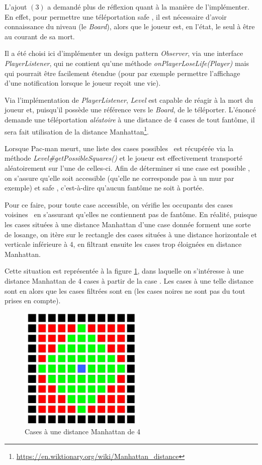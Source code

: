 \documentclass[12pt, openany]{report}
\begin{document}
L'ajout $(3)$ a demandé plus de réflexion quant à la manière de l'implémenter. En effet, pour permettre une téléportation \og safe \fg , il est nécessaire d'avoir connaissance du niveau (le \mbox{\textit{Board}}), alors que le joueur est, en l'état, le seul à être au courant de sa mort.

Il a été choisi ici d'implémenter un design pattern \mbox{\textit{Observer}}, via une interface \mbox{\textit{PlayerListener}}, qui ne contient qu'une méthode \mbox{\textit{onPlayerLoseLife(Player)}} mais qui pourrait être facilement étendue (pour par exemple permettre l'affichage d'une notification lorsque le joueur reçoit une vie).

Via l'implémentation de \mbox{\textit{PlayerListener}}, \mbox{\textit{Level}} est capable de réagir à la mort du joueur et, puisqu'il possède une référence vers le \mbox{\textit{Board}}, de le téléporter. L'énoncé demande une téléportation \textit{aléatoire} à une distance de 4 cases de tout fantôme, il sera fait utilisation de la distance Manhattan\footnote{\url{https://en.wiktionary.org/wiki/Manhattan_distance}}.

Lorsque Pac-man meurt, une liste des cases \og possibles \fg \, est récupérée via la méthode \mbox{\textit{Level\#getPossibleSquares()}} et le joueur est effectivement transporté aléatoirement sur l'une de celles-ci. Afin de déterminer si une case est \og possible \fg , on s'assure qu'elle soit accessible (qu'elle ne corresponde pas à un mur par exemple) et \og safe \fg , c'est-à-dire qu'aucun fantôme ne soit à portée.

Pour ce faire, pour toute case accessible, on vérifie les occupants des cases \og voisines \fg \, en s'assurant qu'elles ne contiennent pas de fantôme. En réalité, puisque les cases situées à une distance Manhattan d'une case donnée forment une sorte de losange, on itère sur le rectangle des cases situées à une distance horizontale et verticale inférieure à 4, en filtrant ensuite les cases trop éloignées en distance Manhattan. 

Cette situation est représentée à la figure \ref{manhattan}, dans laquelle on s'intéresse à une distance Manhattan de 4 cases à partir de la case {\color{blue}{bleue}}. Les cases à une telle distance sont en {\color{green}{vert}} alors que les cases filtrées sont en {\color{red}{rouge}} (les cases noires ne sont pas du tout prises en compte).
\begin{figure}[h]
	\centering
	\includegraphics[width=6cm]{Images/manhattan.jpg}
	\caption{\label{manhattan} Cases à une distance Manhattan de 4}
\end{figure}
\end{document}
